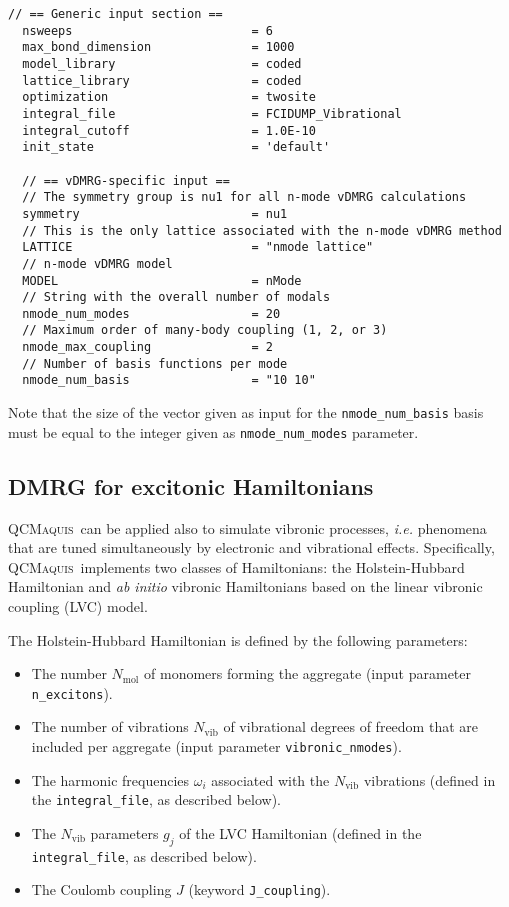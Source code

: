 \documentclass[bibliography=totoc,12pt,a4paper]{scrartcl}
\newcommand{\qcm}{\textsc{QCMaquis}}
\begin{document}
\begin{lstlisting}[language=qcmaquis,
				   caption={Input example for a $n$-mode vDMRG-FCI calculation},
				   label=lst:nModeVibInput]
  // == Generic input section ==
  nsweeps                         = 6
  max_bond_dimension              = 1000
  model_library                   = coded
  lattice_library                 = coded
  optimization                    = twosite 
  integral_file                   = FCIDUMP_Vibrational
  integral_cutoff                 = 1.0E-10
  init_state                      = 'default'

  // == vDMRG-specific input ==
  // The symmetry group is nu1 for all n-mode vDMRG calculations
  symmetry                        = nu1
  // This is the only lattice associated with the n-mode vDMRG method
  LATTICE                         = "nmode lattice" 
  // n-mode vDMRG model
  MODEL                           = nMode
  // String with the overall number of modals
  nmode_num_modes                 = 20
  // Maximum order of many-body coupling (1, 2, or 3)
  nmode_max_coupling              = 2
  // Number of basis functions per mode
  nmode_num_basis                 = "10 10"
\end{lstlisting}

Note that the size of the vector given as input for the \texttt{nmode\_num\_basis} basis must be equal to the integer given as \texttt{nmode\_num\_modes} parameter.

\subsection{DMRG for excitonic Hamiltonians}
\label{sec:excitonic}

\qcm\ can be applied also to simulate vibronic processes, \textit{i.e.} phenomena that are tuned simultaneously by electronic and vibrational effects.
Specifically, \qcm\ implements two classes of Hamiltonians: the Holstein-Hubbard Hamiltonian and \textit{ab initio} vibronic Hamiltonians based on the linear vibronic coupling (LVC) model.

The Holstein-Hubbard Hamiltonian is defined by the following parameters:

\begin{itemize}
  \item The number $N_\text{mol}$ of monomers forming the aggregate (input parameter \texttt{n\_excitons}).
  \item The number of vibrations $N_\text{vib}$ of vibrational degrees of freedom that are included per aggregate (input parameter \texttt{vibronic\_nmodes}).
  \item The harmonic frequencies $\omega_i$ associated with the $N_\text{vib}$ vibrations (defined in the \texttt{integral\_file}, as described below).
  \item The $N_\text{vib}$ parameters $g_j$ of the LVC Hamiltonian (defined in the \texttt{integral\_file}, as described below).
  \item The Coulomb coupling $J$ (keyword \texttt{J\_coupling}).
\end{itemize}
\end{document}
